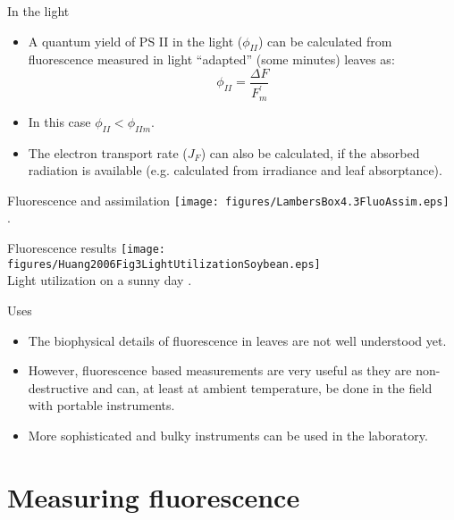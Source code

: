 \documentclass[10pt]{beamer}
\begin{document}
\begin{frame}{In the light}
    \begin{itemize}
        \item A quantum yield of PS II in the light ($\phi_{II}$)
        can be calculated from fluorescence measured in light
        ``adapted'' (some minutes) leaves as:
        $$\phi_{II} = \frac{\Delta F}{F_m^\prime}$$
        \item In this case $\phi_{II} < \phi_{IIm}$.
        \item The electron transport rate ($J_F$) can also be calculated, if
        the absorbed radiation is available (e.g. calculated from irradiance
        and leaf absorptance).
    \end{itemize}
\end{frame}

\begin{frame}{Fluorescence and assimilation}
    \centering
    \texttt{[image: figures/LambersBox4.3FluoAssim.eps]}\\
    {\small \autocite[from][]{LambersEtAl1998}.}
\end{frame}

\begin{frame}{Fluorescence results}
    \centering
    \texttt{[image: figures/Huang2006Fig3LightUtilizationSoybean.eps]}\\
    {\small Light utilization on a sunny day \autocite[from][]{HuangEtAl2006}.}
\end{frame}

\begin{frame}{Uses}
    \begin{itemize}
        \item The biophysical details of fluorescence in leaves
        are not well understood yet.
        \item However, fluorescence based measurements are very
        useful as they are non-destructive and can, at least at
        ambient temperature, be done in the field with portable
        instruments.
        \item More sophisticated and bulky instruments can be
        used in the laboratory.
    \end{itemize}
\end{frame}

\section{Measuring fluorescence}
\end{document}
